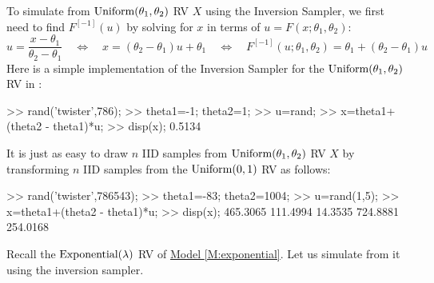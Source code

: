 \begin{simulation}\label{SIM:Uniformab}
To simulate from $\mbox{{\rm Uniform}}(\theta_1,\theta_2)$ RV $X$ using the Inversion Sampler, we first need to find $F^{[-1]}(u)$ by solving for $x$ in terms of $u=F(x;\theta_1,\theta_2)$:
\[
u = \frac{x-\theta_1}{\theta_2-\theta_1} \quad \iff  \quad x = (\theta_2-\theta_1)u+\theta_1 \quad  \iff \quad  F^{[-1]}(u;\theta_1,\theta_2) = \theta_1+(\theta_2-\theta_1)u
\]
Here is a simple implementation of the Inversion Sampler for the $\mbox{{\rm Uniform}}(\theta_1,\theta_2)$ RV in \Matlab:
\begin{VrbM}
>> rand('twister',786); %
>> theta1=-1; theta2=1; %
>> u=rand; %
>> x=theta1+(theta2 - theta1)*u; %
>> disp(x); %
    0.5134
\end{VrbM}
It is just as easy to draw $n$ IID samples from $\mbox{{\rm Uniform}}(\theta_1,\theta_2)$ RV $X$ by transforming $n$ IID samples from the $\mbox{{\rm Uniform}}(0,1)$ RV as follows:
\begin{VrbM}
>> rand('twister',786543); %
>> theta1=-83; theta2=1004; %
>> u=rand(1,5); %
>> x=theta1+(theta2 - theta1)*u; %
>> disp(x); %
  465.3065  111.4994   14.3535  724.8881  254.0168
\end{VrbM}
\end{simulation}


Recall the $\mbox{{\rm Exponential}}(\lambda)$ RV of \hyperref[M:exponential]{Model \ref*{M:exponential}}. Let us simulate from it using the inversion sampler.


